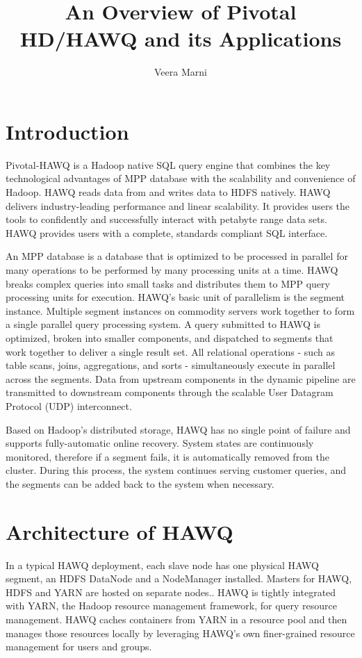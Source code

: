 \documentclass[9pt,twocolumn,twoside]{../../styles/osajnl}
\title{An Overview of Pivotal HD/HAWQ and its Applications}
\author[1]{Veera Marni}
\affil[1]{School of Informatics and Computing, Bloomington, IN 47408, 
U.S.A.}
\affil[*]{Corresponding authors: vmarni@umail.iu.edu}
\begin{document}
\maketitle

\section{Introduction} 

{Pivotal-HAWQ}\cite{www-about-hawq} is a Hadoop native SQL query 
engine that 
combines the key technological advantages of MPP database with the 
scalability and convenience of Hadoop. HAWQ reads data from and 
writes data to HDFS natively. HAWQ delivers industry-leading 
performance and linear scalability. It provides users the tools to 
confidently and successfully interact with petabyte range data sets. 
HAWQ provides users with a complete, standards compliant SQL 
interface.

{An MPP database is a database that is optimized to be processed in 
parallel for many operations to	be performed by many processing units 
at a time.}\cite{www-about-mpp} HAWQ breaks complex queries into 
small tasks and distributes them to MPP query processing units for 
execution. HAWQ’s basic unit of parallelism is the segment instance. 
Multiple segment instances on commodity servers work together to form 
a single parallel query processing system. A query submitted to HAWQ 
is optimized, broken into smaller components, and dispatched to 
segments that work together to deliver a single result set. All 
relational operations - such as table scans, joins, aggregations, and 
sorts - simultaneously execute in parallel across the segments. Data 
from upstream components in the dynamic pipeline are transmitted to 
downstream components through the scalable User Datagram Protocol 
(UDP) interconnect.

Based on Hadoop’s distributed storage, HAWQ has no single point of 
failure and supports fully-automatic online recovery. System states 
are continuously monitored, therefore if a segment fails, it is 
automatically removed from the cluster. During this process, the 
system continues serving customer queries, and the segments can be 
added back to the system when necessary.

\section{Architecture of HAWQ}

{In a typical HAWQ deployment, each slave node has one physical HAWQ 
segment, an HDFS DataNode and a NodeManager installed. Masters for 
HAWQ, HDFS and YARN are hosted on separate 
nodes.}\cite{www-hawq-architecture}. HAWQ is tightly integrated with 
YARN, the Hadoop resource management 
framework, for query resource management. HAWQ caches containers from 
YARN in a resource pool and then manages those resources locally by 
leveraging HAWQ’s own finer-grained resource management for users and 
groups.
\end{document}

